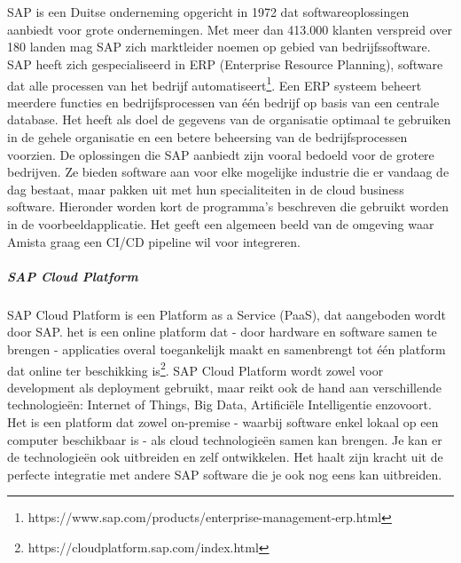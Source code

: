 \chapter{}
\label{ch:sap}
SAP is een Duitse onderneming opgericht in 1972 dat softwareoplossingen aanbiedt voor grote ondernemingen. Met meer dan 413.000 klanten verspreid over 180 landen mag SAP zich marktleider noemen op gebied van bedrijfssoftware.
SAP heeft zich gespecialiseerd in ERP (Enterprise Resource Planning), software dat alle processen van het bedrijf automatiseert\footnote{https://www.sap.com/products/enterprise-management-erp.html}. Een ERP systeem beheert meerdere functies en bedrijfsprocessen van één bedrijf op basis van een centrale database. Het heeft als doel de gegevens van de organisatie optimaal te gebruiken in de gehele organisatie en een betere beheersing van de bedrijfsprocessen voorzien.
De oplossingen die SAP aanbiedt zijn vooral bedoeld voor de grotere bedrijven. Ze bieden software aan voor elke mogelijke industrie die er vandaag de dag bestaat, maar pakken uit met hun specialiteiten in de cloud business software.
Hieronder worden kort de programma's beschreven die gebruikt worden in de voorbeeldapplicatie. Het geeft een algemeen beeld van de omgeving waar Amista graag een CI/CD pipeline wil voor integreren.

    \paragraph{SAP Cloud Platform}
    SAP Cloud Platform is een Platform as a Service (PaaS), dat aangeboden wordt door SAP. het is een online platform dat - door hardware en software samen te brengen - applicaties overal toegankelijk maakt en samenbrengt tot één platform dat online ter beschikking is\footnote{https://cloudplatform.sap.com/index.html}.
    SAP Cloud Platform wordt zowel voor development als deployment gebruikt, maar reikt ook de hand aan verschillende technologieën: Internet of Things, Big Data, Artificiële Intelligentie enzovoort. Het is een platform dat zowel on-premise - waarbij software enkel lokaal op een computer beschikbaar is - als cloud technologieën samen kan brengen. Je kan er de technologieën ook uitbreiden en zelf ontwikkelen. Het haalt zijn kracht uit de perfecte integratie met andere SAP software die je ook nog eens kan uitbreiden.
    
